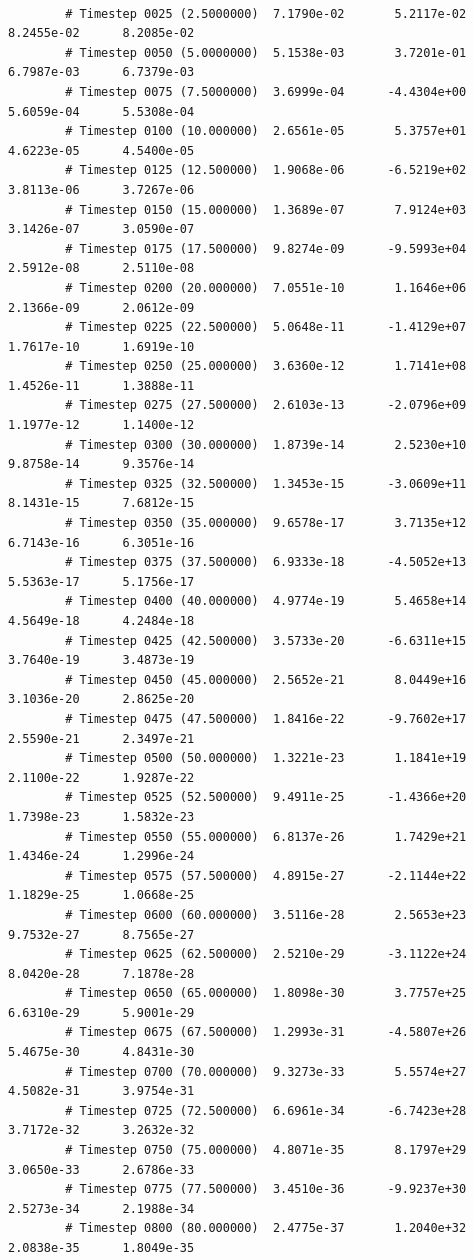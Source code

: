 \documentclass[10pt]{article}
\begin{document}
{\begin{verbatim}
		
		# Timestep 0025 (2.5000000)	 7.1790e-02 	  5.2117e-02 	 8.2455e-02 	 8.2085e-02
		# Timestep 0050 (5.0000000)	 5.1538e-03 	  3.7201e-01 	 6.7987e-03 	 6.7379e-03 
		# Timestep 0075 (7.5000000)	 3.6999e-04 	 -4.4304e+00 	 5.6059e-04 	 5.5308e-04 
		# Timestep 0100 (10.000000)	 2.6561e-05 	  5.3757e+01 	 4.6223e-05 	 4.5400e-05 
		# Timestep 0125 (12.500000)	 1.9068e-06 	 -6.5219e+02 	 3.8113e-06 	 3.7267e-06 
		# Timestep 0150 (15.000000)	 1.3689e-07 	  7.9124e+03 	 3.1426e-07 	 3.0590e-07 
		# Timestep 0175 (17.500000)	 9.8274e-09 	 -9.5993e+04 	 2.5912e-08 	 2.5110e-08 
		# Timestep 0200 (20.000000)	 7.0551e-10 	  1.1646e+06 	 2.1366e-09 	 2.0612e-09 
		# Timestep 0225 (22.500000)	 5.0648e-11 	 -1.4129e+07 	 1.7617e-10 	 1.6919e-10 
		# Timestep 0250 (25.000000)	 3.6360e-12 	  1.7141e+08 	 1.4526e-11 	 1.3888e-11 
		# Timestep 0275 (27.500000)	 2.6103e-13 	 -2.0796e+09 	 1.1977e-12 	 1.1400e-12 
		# Timestep 0300 (30.000000)	 1.8739e-14 	  2.5230e+10 	 9.8758e-14 	 9.3576e-14 
		# Timestep 0325 (32.500000)	 1.3453e-15 	 -3.0609e+11 	 8.1431e-15 	 7.6812e-15 
		# Timestep 0350 (35.000000)	 9.6578e-17 	  3.7135e+12 	 6.7143e-16 	 6.3051e-16 
		# Timestep 0375 (37.500000)	 6.9333e-18 	 -4.5052e+13 	 5.5363e-17 	 5.1756e-17 
		# Timestep 0400 (40.000000)	 4.9774e-19 	  5.4658e+14 	 4.5649e-18 	 4.2484e-18 
		# Timestep 0425 (42.500000)	 3.5733e-20 	 -6.6311e+15 	 3.7640e-19 	 3.4873e-19 
		# Timestep 0450 (45.000000)	 2.5652e-21 	  8.0449e+16 	 3.1036e-20 	 2.8625e-20 
		# Timestep 0475 (47.500000)	 1.8416e-22 	 -9.7602e+17 	 2.5590e-21 	 2.3497e-21 
		# Timestep 0500 (50.000000)	 1.3221e-23 	  1.1841e+19 	 2.1100e-22 	 1.9287e-22 
		# Timestep 0525 (52.500000)	 9.4911e-25 	 -1.4366e+20 	 1.7398e-23 	 1.5832e-23 
		# Timestep 0550 (55.000000)	 6.8137e-26 	  1.7429e+21 	 1.4346e-24 	 1.2996e-24 
		# Timestep 0575 (57.500000)	 4.8915e-27 	 -2.1144e+22 	 1.1829e-25 	 1.0668e-25 
		# Timestep 0600 (60.000000)	 3.5116e-28 	  2.5653e+23 	 9.7532e-27 	 8.7565e-27 
		# Timestep 0625 (62.500000)	 2.5210e-29 	 -3.1122e+24 	 8.0420e-28 	 7.1878e-28 
		# Timestep 0650 (65.000000)	 1.8098e-30 	  3.7757e+25 	 6.6310e-29 	 5.9001e-29 
		# Timestep 0675 (67.500000)	 1.2993e-31 	 -4.5807e+26 	 5.4675e-30 	 4.8431e-30 
		# Timestep 0700 (70.000000)	 9.3273e-33 	  5.5574e+27 	 4.5082e-31 	 3.9754e-31 
		# Timestep 0725 (72.500000)	 6.6961e-34 	 -6.7423e+28 	 3.7172e-32 	 3.2632e-32 
		# Timestep 0750 (75.000000)	 4.8071e-35 	  8.1797e+29 	 3.0650e-33 	 2.6786e-33 
		# Timestep 0775 (77.500000)	 3.4510e-36 	 -9.9237e+30 	 2.5273e-34 	 2.1988e-34 
		# Timestep 0800 (80.000000)	 2.4775e-37 	  1.2040e+32 	 2.0838e-35 	 1.8049e-35 

\end{verbatim}}
\end{document}
